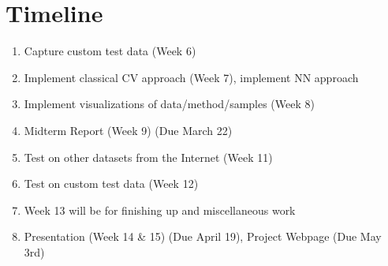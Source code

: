 \documentclass{article}
\begin{document}
\section{Timeline}
\begin{enumerate} %
    \item Capture custom test data (Week 6)
    \item Implement classical CV approach (Week 7), implement NN approach
    \item Implement visualizations of data/method/samples (Week 8)
    \item Midterm Report (Week 9) (Due March 22)
    \item Test on other datasets from the Internet (Week 11)
    \item Test on custom test data (Week 12)
    \item Week 13 will be for finishing up and miscellaneous work
    \item Presentation (Week 14 \& 15) (Due April 19), Project Webpage (Due May 3rd)
\end{enumerate}


\end{document}
